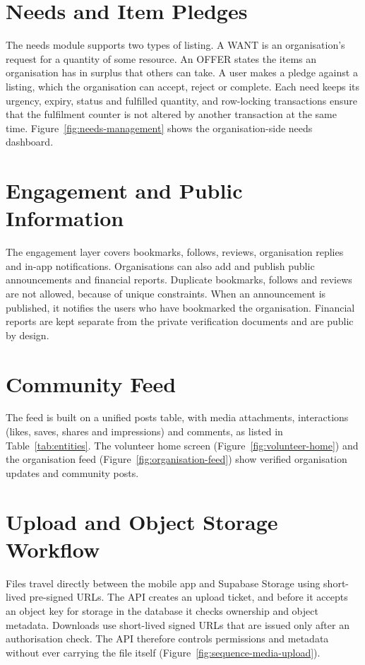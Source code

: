 
\section{Needs and Item Pledges}
\label{sec:impl-needs}
The needs module supports two types of listing. A WANT is an organisation's request for a quantity of some resource. An OFFER states the items an organisation has in surplus that others can take. A user makes a pledge against a listing, which the organisation can accept, reject or complete. Each need keeps its urgency, expiry, status and fulfilled quantity, and row-locking transactions ensure that the fulfilment counter is not altered by another transaction at the same time. Figure~\ref{fig:needs-management} shows the organisation-side needs dashboard.

\section{Engagement and Public Information}
\label{sec:impl-engagement}
The engagement layer covers bookmarks, follows, reviews, organisation replies and in-app notifications. Organisations can also add and publish public announcements and financial reports. Duplicate bookmarks, follows and reviews are not allowed, because of unique constraints. When an announcement is published, it notifies the users who have bookmarked the organisation. Financial reports are kept separate from the private verification documents and are public by design.

\section{Community Feed}
\label{sec:impl-feed}
The feed is built on a unified posts table, with media attachments, interactions (likes, saves, shares and impressions) and comments, as listed in Table~\ref{tab:entities}. The volunteer home screen (Figure~\ref{fig:volunteer-home}) and the organisation feed (Figure~\ref{fig:organisation-feed}) show verified organisation updates and community posts.

\section{Upload and Object Storage Workflow}
\label{sec:impl-uploads}
Files travel directly between the mobile app and Supabase Storage using short-lived pre-signed URLs. The API creates an upload ticket, and before it accepts an object key for storage in the database it checks ownership and object metadata. Downloads use short-lived signed URLs that are issued only after an authorisation check. The API therefore controls permissions and metadata without ever carrying the file itself (Figure~\ref{fig:sequence-media-upload}).

